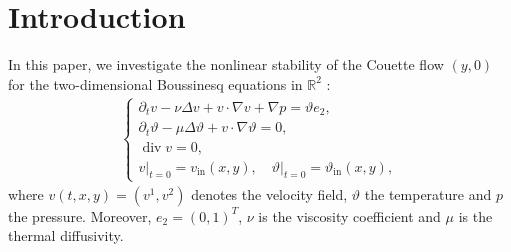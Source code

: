\documentclass[reqno, 12pt]{amsart} %
\theoremstyle{plain} %
\theoremstyle{definition}
\theoremstyle{remark}
\numberwithin{equation}{section} %
\newcommand{\pt}{\partial_t}
\begin{document}
	
	
	
	
	\maketitle
	\tableofcontents
	\section{Introduction}    
	In this paper, we investigate the nonlinear stability of the Couette flow $(y, 0)$ for the two-dimensional Boussinesq equations in $\mathbb{R}^2$ :
	\begin{align} \label{eq:main0}
		\left\{\begin{array}{l}
			\partial_t v-\nu \Delta v+v \cdot \nabla v+\nabla p =  \vartheta e_2, \\
			\pt \vartheta - \mu \Delta \vartheta +v\cdot \nabla \vartheta = 0    ,\\
			\operatorname{div} v=0, \\
			\left.v\right|_{t=0}=v_{\text{in}}(x, y), \quad \left.\vartheta\right|_{t=0}=\vartheta_{\text{in}}(x, y),
		\end{array}\right.
	\end{align}
	where $v(t, x, y)=\left(v^1, v^2\right)$ denotes the velocity field, $\vartheta$ the temperature and $p$ the pressure. Moreover, $e_2 = (0, 1)^T$, $\nu$ is the viscosity coefficient and $\mu$ is the thermal diffusivity.
\end{document}
